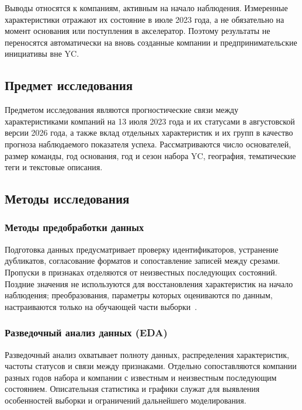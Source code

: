 Выводы относятся к компаниям, активным на начало наблюдения. Измеренные характеристики отражают их состояние в июле 2023 года, а не обязательно на момент основания или поступления в акселератор. Поэтому результаты не переносятся автоматически на вновь созданные компании и предпринимательские инициативы вне YC.

\subsection{Предмет исследования}

Предметом исследования являются прогностические связи между характеристиками компаний на 13 июля 2023 года и их статусами в августовской версии 2026 года, а также вклад отдельных характеристик и их групп в качество прогноза наблюдаемого показателя успеха. Рассматриваются число основателей, размер команды, год основания, год и сезон набора YC, география, тематические теги и текстовые описания.

\subsection{Методы исследования}

\subsubsection{Методы предобработки данных}

Подготовка данных предусматривает проверку идентификаторов, устранение дубликатов, согласование форматов и сопоставление записей между срезами. Пропуски в признаках отделяются от неизвестных последующих состояний. Поздние значения не используются для восстановления характеристик на начало наблюдения; преобразования, параметры которых оцениваются по данным, настраиваются только на обучающей части выборки~\cite{kapoor2023}.

\subsubsection{Разведочный анализ данных (EDA)}

Разведочный анализ охватывает полноту данных, распределения характеристик, частоты статусов и связи между признаками. Отдельно сопоставляются компании разных годов набора и компании с известным и неизвестным последующим состоянием. Описательная статистика и графики служат для выявления особенностей выборки и ограничений дальнейшего моделирования.

